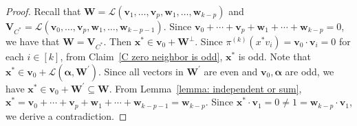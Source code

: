 \documentclass[10pt,a4paper]{amsart}
\begin{document}
\begin{proof}
 Recall that $\mathbf{W} = \mathcal{L}(\mathbf{v}_1, \ldots, \mathbf{v}_p, \mathbf{w}_1, \ldots, \mathbf{w}_{k-p})$ and $\mathbf{V}_{C^*} = \mathcal{L}(\mathbf{v}_0, \ldots, \mathbf{v}_p, \mathbf{w}_1, \ldots, \mathbf{w}_{k-p-1})$. 
 Since $ \textbf{v}_0+\cdots+\textbf{v}_p+\textbf{w}_1+\cdots+\textbf{w}_{k-p}=0 $, we have that $\mathbf{W}=\textbf{V}_{C^*}$.
  Then $\textbf{x}^*\in \textbf{v}_0 + \mathbf{W}^{\perp}$. Since $\pi^{(k)}(x^* v_i) =\textbf{v}_0\cdot \textbf{v}_i=0$ for each $i\in [k]$,
  from Claim~\ref{C zero neighbor is odd}, $\textbf{x}^*$ is odd. Note that $\textbf{x}^*\in \textbf{v}_0+\mathcal{L}(\boldsymbol{\alpha},\mathbf{W}^{\prime})$. Since all vectors in $\mathbf{W}^{\prime}$ are  even and $\textbf{v}_0,\boldsymbol{\alpha}$ are odd, we have $\textbf{x}^*\in \textbf{v}_0+\mathbf{W}^{\prime}\subseteq \mathbf{W}$.
  From Lemma~\ref{lemma: independent or sum}, $\textbf{x}^*= \textbf{v}_0+\cdots+\textbf{v}_p+\textbf{w}_1+\cdots+\textbf{w}_{k-p-1}=\textbf{w}_{k-p}$. Since $\textbf{x}^{*}\cdot \mathbf{v}_1=0\neq 1=\textbf{w}_{k-p}\cdot \mathbf{v}_1$, we derive a contradiction.
\end{proof}
\end{document}
